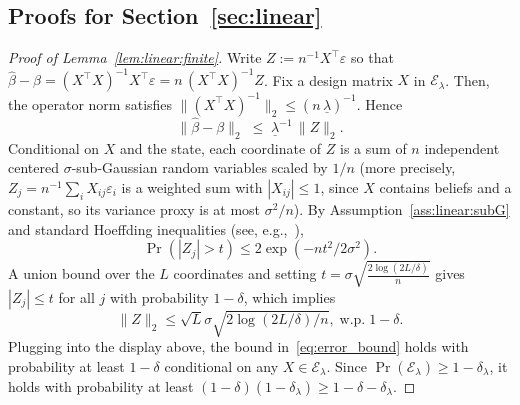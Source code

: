 \documentclass[12pt,reqno]{amsart}
\begin{document}
 
\subsection{Proofs for Section~\ref{sec:linear}}\label{app:linearproofs}

\begin{proof}[Proof of Lemma~\ref{lem:linear:finite}]\label{app:proof-linear-lemma}
    Write $Z:=n^{-1}X^{\top}\varepsilon$ so that
    $\widehat{\beta}-\beta = (X^{\top}X)^{-1} X^{\top}\varepsilon = n\,(X^{\top}X)^{-1} Z$.
    Fix a design matrix $X$ in $\mathcal{E}_\lambda$. Then, the operator norm satisfies
    $\|(X^{\top}X)^{-1}\|_2\le(n\,\underline\lambda)^{-1}$. Hence
    \[\|\widehat{\beta}-\beta\|_2\;\le\;\underline\lambda^{-1}\,\|Z\|_2.\]
    Conditional on $X$ and the state, each coordinate of $Z$ is a sum of $n$ independent centered $\sigma$-sub-Gaussian
    random variables scaled by $1/n$ (more precisely, $Z_j=n^{-1}\sum_i X_{ij}\varepsilon_i$ is a weighted sum with $|X_{ij}|\le1$, since $X$ contains beliefs and a constant, so its variance proxy is at most $\sigma^2/n$). By Assumption~\ref{ass:linear:subG} and standard Hoeffding inequalities (see, e.g.,~\cite[Ch.~2]{vershynin2018highdim}),
    \[\Pr(|Z_j|\!>\!t)\le2\exp(-n t^2/2\sigma^2).\]
    A union bound over the $L$
    coordinates and setting $t=\sigma\sqrt{\tfrac{2\log(2L/\delta)}{n}}$ gives $|Z_j|\le t$ for all $j$ with probability $1-\delta$, which implies
    \[\|Z\|_2\le\sqrt{L}\sigma\sqrt{2\log(2L/\delta)/n},\; \text{w.p.} \;1-\delta.\]
    Plugging into the display above, the bound in~\eqref{eq:error_bound} holds with probability at least $1-\delta$ conditional on any $X\in\mathcal{E}_\lambda$. Since $\Pr(\mathcal{E}_\lambda)\geq1-\delta_\lambda$, it holds with probability at least $(1-\delta)(1-\delta_\lambda)\geq1-\delta-\delta_\lambda$.
    \end{proof}
\end{document}
